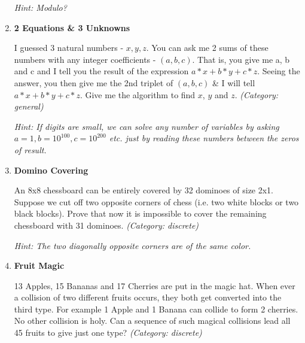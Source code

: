 \begin{enumerate}
\small\emph{Hint: Modulo?}





\item \textbf{2 Equations \& 3 Unknowns }

I guessed 3 natural numbers - $x, y, z$. You can ask me 2 sums of these numbers with any integer coefficients - $(a, b, c)$. That is, you give me a, b and c and I tell you the result of the expression $a*x+b*y+c*z$. Seeing the answer, you then give me the 2nd triplet of $(a,b,c)$ \& I will tell $a*x+b*y+c*z$. Give me the algorithm to find $x$, $y$ and $z$.
\small\emph{(Category: general)}

\small\emph{Hint: If digits are small, we can solve any number of variables by asking $a=1, b=10^{100}, c=10^{200}$ etc. just by reading these numbers between the zeros of result.}





\item \textbf{Domino Covering}

An 8x8 chessboard can be entirely covered by 32 dominoes of size 2x1. Suppose we cut off two opposite corners of chess (i.e. two white blocks or two black blocks). Prove that now it is impossible to cover the remaining chessboard with 31 dominoes.
\small\emph{(Category: discrete)}

\small\emph{Hint: The two diagonally opposite corners are of the same color.}





\item \textbf{Fruit Magic}

13 Apples, 15 Bananas and 17 Cherries are put in the magic hat. When ever a collision of two different fruits occurs, they both get converted into the third type. For example 1 Apple and 1 Banana can collide to form 2 cherries. No other collision is holy. Can a sequence of such magical collisions lead all 45 fruits to give just one type?
\small\emph{(Category: discrete)}


\end{enumerate}
